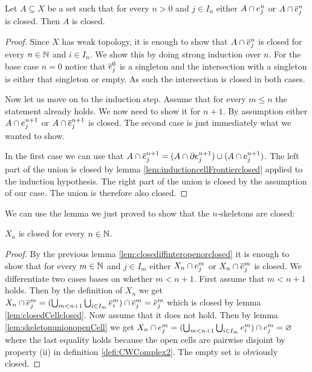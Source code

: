 \begin{lem}\label{lem:closediffinteropenorclosed}
    Let $A \subseteq X$ be a set such that for every $n > 0$ and $j \in I_n$ either $A \cap \openCell{n}{j}$ or $A \cap \closedCell{n}{j}$ is closed.
    Then $A$ is closed.
\end{lem}
\begin{proof}
    Since $X$ has weak topology, it is enough to show that $A \cap \closedCell{n}{j}$ is closed for every $n \in \bN$ and $i \in I_n$.
    We show this by doing strong induction over $n$.
    For the base case $n = 0$ notice that $\closedCell{0}{j}$ is a singleton and the intersection with a singleton is either that singleton or empty.
    As such the intersection is closed in both cases.

    Now let us move on to the induction step.
    Assume that for every $m \le n$ the statement already holds.
    We now need to show it for $n + 1$.
    By assumption either $A \cap \openCell{n + 1}{j}$ or $A \cap \closedCell{n + 1}{j}$ is closed. The second case is just immediately what we wanted to show.

    In the first case we can use that $A \cap \closedCell{n + 1}{j} = (A \cap \cellFrontier{n + 1}{j}) \cup (A \cap \openCell{n + 1}{j})$.
    The left part of the union is closed by lemma \ref{lem:inductioncellFrontierclosed} applied to the induction hypothesis.
    The right part of the union is closed by the assumption of our case.
    The union is therefore also closed.
\end{proof}

We can use the lemma we just proved to show that the $n$-skeletons are closed:

\begin{lem}\label{lem:levelclosed}
    $X_n$ is closed for every $n \in \bN$.
\end{lem}
\begin{proof}
    By the previous lemma \ref{lem:closediffinteropenorclosed} it is enough to show that for every $m \in \bN$ and $j \in I_m$ either $X_n \cap \openCell{m}{j}$ or $X_n \cap \closedCell{m}{j}$ is closed.
    We differentiate two cases bases on whether $m < n + 1$.
    First assume that $m < n + 1$ holds.
    Then by the definition of $X_n$ we get $X_n \cap \closedCell{m}{j} = (\bigcup_{m < n + 1} \bigcup_{i \in I_m} \closedCell{m}{i}) \cap \closedCell{m}{j} = \closedCell{m}{j}$ which is closed by lemma \ref{lem:closedCellclosed}.
    Now assume that it does not hold.
    Then by lemma \ref{lem:skeletonunionopenCell} we get $X_n \cap \openCell{m}{j} = (\bigcup_{m < n + 1} \bigcup_{i \in I_m} \openCell{m}{i}) \cap \openCell{m}{j} = \varnothing$ where the last equality holds because the open cells are pairwise disjoint by property (ii) in definition \ref{defi:CWComplex2}.
    The empty set is obviously closed.
\end{proof}

